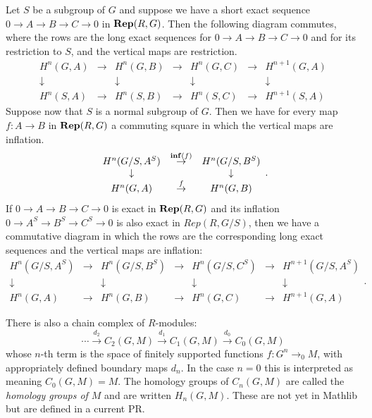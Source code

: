 \begin{lemma} \label{lem:inflation restriction naturality}
	\leanok
	Let $S$ be a subgroup of $G$ and suppose we have a short exact sequence
	$0 \to A \to B \to C \to 0$ in $\mathbf{Rep}(R,G)$.
	Then the following diagram commutes, where the rows are the long exact sequences
	for $0 \to A \to B \to C \to 0$ and for its restriction to $S$,
	and the vertical maps are restriction.
	\[
  	\begin{array}{ccccccc}
			H^n(G,A) & \to & H^n(G,B) &\to &H^n(G,C)& \to& H^{n+1}(G,A)\\
			\downarrow&&\downarrow&&\downarrow&&\downarrow \\
			H^n(S,A) & \to & H^n(S,B) &\to &H^n(S,C)& \to& H^{n+1}(S,A)
		\end{array}
  \]
	Suppose now that $S$ is a normal subgroup of $G$. Then we have for every
	map $f : A \to B$ in $\mathbf{Rep}(R,G)$ a commuting square in which the vertical maps are inflation.
	\[
  	\begin{array}{ccccccc}
			H^n(G/S,A^S) & \stackrel{\mathbf{inf}(f)}\to & H^n(G/S,B^S)\\
			\downarrow&&\downarrow \\
			H^n(G,A) & \stackrel{f}\to & H^n(G,B)
		\end{array}.
	\]
	If $0 \to A \to B \to C \to 0$ is exact in $\mathbf{Rep}(R,G)$ and its inflation
	$0 \to A^S \to B^S \to C^S \to 0$ is also exact in $Rep(R,G/S)$, then
	we have a commutative diagram in which the rows are the corresponding long exact
	sequences and the vertical maps are inflation:
	\[
  	\begin{array}{ccccccc}
			H^n(G/S,A^S) & \to & H^n(G/S,B^S) &\to &H^n(G/S,C^S)& \to& H^{n+1}(G/S,A^S)\\
			\downarrow&&\downarrow&&\downarrow&&\downarrow \\
			H^n(G,A) & \to & H^n(G,B) &\to &H^n(G,C)& \to& H^{n+1}(G,A)
		\end{array}.
  \]
\end{lemma}

\begin{definition} \label{def:group homology}
	There is also a chain complex of $R$-modules:
	\[
		\cdots \stackrel{d_2}\to C_2(G,M) \stackrel{d_1}\to C_1(G,M) \stackrel{d_0}\to C_0(G,M)
	\]
	whose $n$-th term is the space of finitely supported functions
	$f : G^n \to_0 M$, with appropriately defined boundary maps $d_n$.
	In the case $n=0$ this is interpreted as meaning $C_0(G,M) = M$.
	The homology groups of $C_n(G,M)$ are called the \emph{homology groups of $M$}
	and are written $H_n(G,M)$.
	These are not yet in Mathlib but are defined in a current PR.
\end{definition}

